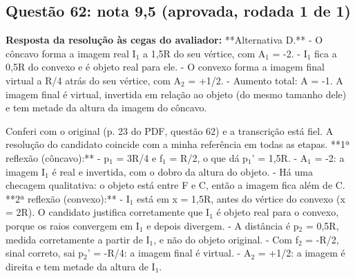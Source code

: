 \documentclass{article}%
\begin{document}
\subsection*{Questão 62: nota 9,5 (aprovada, rodada 1 de 1)}%
\textbf{Resposta da resolução às cegas do avaliador:} **Alternativa D.**\newline%
\newline%
{-} O côncavo forma a imagem real I$_{1}$ a 1,5R do seu vértice, com A$_{1}$ = -2.\newline%
{-} I$_{1}$ fica a 0,5R do convexo e é objeto real para ele.\newline%
{-} O convexo forma a imagem final virtual a R/4 atrás do seu vértice, com A$_{2}$ = +1/2.\newline%
{-} Aumento total: A = -1.\newline%
\newline%
A imagem final é virtual, invertida em relação ao objeto (do mesmo tamanho dele) e tem metade da altura da imagem do côncavo.\par %
Conferi com o original (p. 23 do PDF, questão 62) e a transcrição está fiel. A resolução do candidato coincide com a minha referência em todas as etapas.\newline%
\newline%
**1ª reflexão (côncavo):**\newline%
{-} p$_{1}$ = 3R/4 e f$_{1}$ = R/2, o que dá p$_{1}$' = 1,5R.\newline%
{-} A$_{1}$ = -2: a imagem I$_{1}$ é real e invertida, com o dobro da altura do objeto.\newline%
{-} Há uma checagem qualitativa: o objeto está entre F e C, então a imagem fica além de C.\newline%
\newline%
**2ª reflexão (convexo):**\newline%
{-} I$_{1}$ está em x = 1,5R, antes do vértice do convexo (x = 2R). O candidato justifica corretamente que I$_{1}$ é objeto real para o convexo, porque os raios convergem em I$_{1}$ e depois divergem.\newline%
{-} A distância é p$_{2}$ = 0,5R, medida corretamente a partir de I$_{1}$, e não do objeto original.\newline%
{-} Com f$_{2}$ = -R/2, sinal correto, sai p$_{2}$' = -R/4: a imagem final é virtual.\newline%
{-} A$_{2}$ = +1/2: a imagem é direita e tem metade da altura de I$_{1}$.\newline%
\newline%
\end{document}
